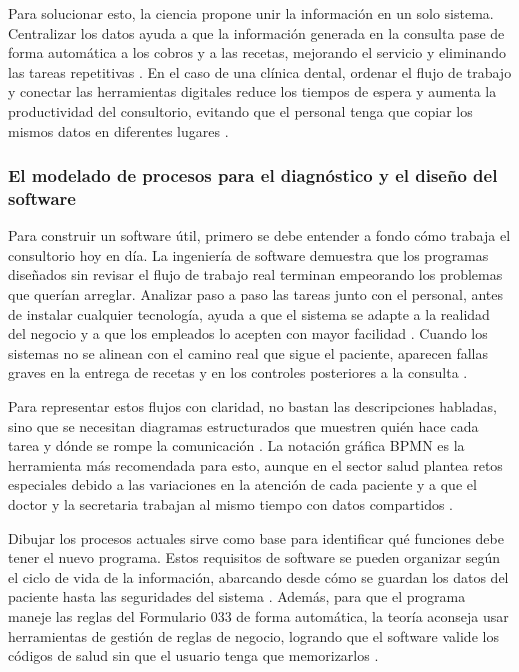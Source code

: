 Para solucionar esto, la ciencia propone unir la información en un solo sistema. Centralizar los datos ayuda a que la información generada en la consulta pase de forma automática a los cobros y a las recetas, mejorando el servicio y eliminando las tareas repetitivas \cite{ovreiu2024empowering}. En el caso de una clínica dental, ordenar el flujo de trabajo y conectar las herramientas digitales reduce los tiempos de espera y aumenta la productividad del consultorio, evitando que el personal tenga que copiar los mismos datos en diferentes lugares \cite{batheja2025optimizing}.

\subsubsection{El modelado de procesos para el diagnóstico y el diseño del software}

Para construir un software útil, primero se debe entender a fondo cómo trabaja el consultorio hoy en día. La ingeniería de software demuestra que los programas diseñados sin revisar el flujo de trabajo real terminan empeorando los problemas que querían arreglar. Analizar paso a paso las tareas junto con el personal, antes de instalar cualquier tecnología, ayuda a que el sistema se adapte a la realidad del negocio y a que los empleados lo acepten con mayor facilidad \cite{staras2021using}. Cuando los sistemas no se alinean con el camino real que sigue el paciente, aparecen fallas graves en la entrega de recetas y en los controles posteriores a la consulta \cite{makerere2024business}.

Para representar estos flujos con claridad, no bastan las descripciones habladas, sino que se necesitan diagramas estructurados que muestren quién hace cada tarea y dónde se rompe la comunicación \cite{antonacci2021process}. La notación gráfica BPMN es la herramienta más recomendada para esto, aunque en el sector salud plantea retos especiales debido a las variaciones en la atención de cada paciente y a que el doctor y la secretaria trabajan al mismo tiempo con datos compartidos \cite{pufahl2022bpmn}.

Dibujar los procesos actuales sirve como base para identificar qué funciones debe tener el nuevo programa. Estos requisitos de software se pueden organizar según el ciclo de vida de la información, abarcando desde cómo se guardan los datos del paciente hasta las seguridades del sistema \cite{kinast2023functional}. Además, para que el programa maneje las reglas del Formulario 033 de forma automática, la teoría aconseja usar herramientas de gestión de reglas de negocio, logrando que el software valide los códigos de salud sin que el usuario tenga que memorizarlos \cite{nelson2014business}. 

